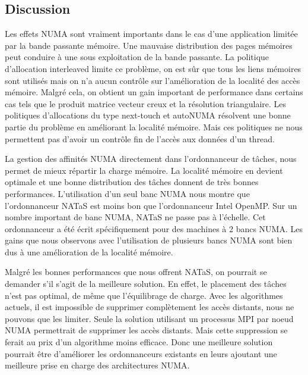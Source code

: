 \subsection{Discussion}
Les effets NUMA sont vraiment importants dans le cas d'une application limitée par la bande passante mémoire.
%
Une mauvaise distribution des pages mémoires peut conduire à une sous exploitation de la bande passante.
%
La politique d'allocation interleaved limite ce problème, on est sûr que tous les liens mémoires sont utilisés mais on n'a aucun contrôle sur l'amélioration de la localité des accès mémoire.
%
Malgré cela, on obtient un gain important de performance dans certains cas tels que le produit matrice vecteur creux et la résolution triangulaire.
%
Les politiques d'allocations du type next-touch et autoNUMA résolvent une bonne partie du problème en améliorant la localité mémoire.
%
Mais ces politiques ne nous permettent pas d'avoir un contrôle fin de l'accès aux données d'un thread.



La gestion des affinités NUMA directement dans l'ordonnanceur de tâches, nous permet de mieux répartir la charge mémoire.
%
La localité mémoire en devient optimale et une bonne distribution des tâches donnent de très bonnes performances.
%
L'utilisation d'un seul banc NUMA nous montre que l'ordonnanceur NATaS est moins bon que l'ordonnanceur Intel OpenMP.
%
Sur un nombre important de banc NUMA, NATaS ne passe pas à l'échelle.
%
Cet ordonnanceur a été écrit spécifiquement pour des machines à 2 bancs NUMA.
%
Les gains que nous observons avec l'utilisation de plusieurs bancs NUMA sont bien dus à une amélioration de la localité mémoire.


Malgré les bonnes performances que nous offrent NATaS, on pourrait se demander s'il s'agit de la meilleure solution.
%
En effet, le placement des tâches n'est pas optimal, de même que l'équilibrage de charge.
%
Avec les algorithmes actuels, il est impossible de supprimer complètement les accès distants, nous ne pouvons que les limiter.
%
Seule la solution utilisant un processus MPI par noeud NUMA permettrait de supprimer les accès distants.
%
Mais cette suppression se ferait au prix d'un algorithme moins efficace.
%
Donc une meilleure solution pourrait être d'améliorer les ordonnanceurs existants en leurs ajoutant une meilleure prise en charge des architectures NUMA.

